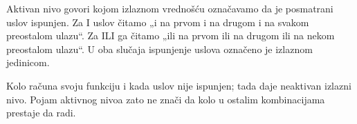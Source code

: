 
Aktivan nivo govori kojom izlaznom vrednošću označavamo da je posmatrani uslov ispunjen. Za I uslov čitamo „i na prvom i na drugom i na svakom preostalom ulazu“. Za ILI ga čitamo „ili na prvom ili na drugom ili na nekom preostalom ulazu“. U oba slučaja ispunjenje uslova označeno je izlaznom jedinicom.

Kolo računa svoju funkciju i kada uslov nije ispunjen; tada daje neaktivan izlazni nivo. Pojam aktivnog nivoa zato ne znači da kolo u ostalim kombinacijama prestaje da radi.
